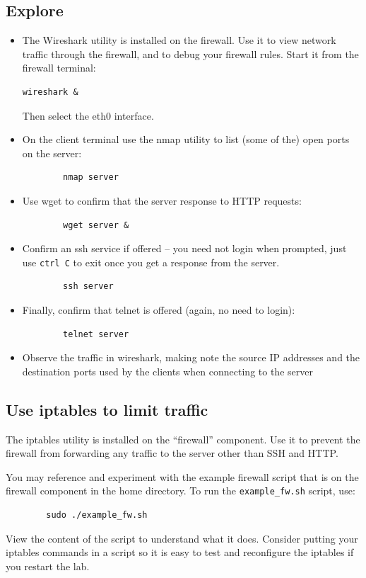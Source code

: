 \subsection{Explore}
\begin{itemize}
\item The Wireshark utility is installed on the firewall. 
Use it to view network traffic through the firewall, and to 
debug your firewall rules.  Start it from the firewall terminal:
\begin{verbatim}
wireshark &
\end{verbatim}
\noindent Then select the eth0 interface.

\item On the client terminal use the nmap utility 
to list (some of the) open ports on the server:

\begin{verbatim}
        nmap server
\end{verbatim}

\item Use wget to confirm that the server response to HTTP requests:
\begin{verbatim}
        wget server &
\end{verbatim}
\item Confirm an ssh service if offered -- you need not login when prompted,
just use {\tt ctrl C} to exit once you get a response from the server.
\begin{verbatim}
        ssh server
\end{verbatim}
\item Finally, confirm that telnet is offered (again, no need to login):
\begin{verbatim}
        telnet server
\end{verbatim}
\item Observe the traffic in wireshark, making note the
source IP addresses and the destination ports used by the 
clients when connecting to the server
\end{itemize}

\subsection{Use iptables to limit traffic}
The iptables utility is installed on the ``firewall'' component.
Use it to prevent the firewall from forwarding any traffic
to the server other than SSH and HTTP.

You may reference and experiment with the example firewall script that
is on the firewall component in the home directory.  
To run the {\tt example\_fw.sh} script, use:
\begin{verbatim}
        sudo ./example_fw.sh
\end{verbatim}
View the content of the script to understand what it does.
Consider putting your iptables commands in a script so it is easy
to test and reconfigure the iptables if you restart the lab.


